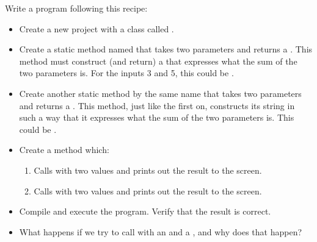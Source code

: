 Write a program following this recipe:
\begin{itemize}
  \item Create a new project with a class called .
  \item Create a static method named  that takes two  parameters and returns a . This method must construct (and return) a  that expresses what the sum of the two parameters is. For the inputs 3 and 5, this could be .
  \item Create another static method by the same name that takes two  parameters and returns a . This method, just like the first on, constructs its string in such a way that it expresses what the sum of the two parameters is. This could be .
  \item Create a  method which:
    \begin{enumerate}
      \item Calls  with two  values and prints out the result to the screen.
      \item Calls  with two  values and prints out the result to the screen.
    \end{enumerate}
  \item Compile and execute the program. Verify that the result is correct.
  \item What happens if we try to call  with an  and a , and why does that happen?
\end{itemize}
